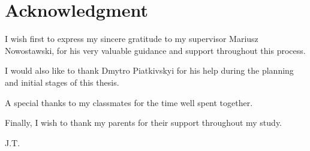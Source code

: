 \chapter*{Acknowledgment}

I wish first to express my sincere gratitude to my supervisor Mariusz Nowostawski, for his very valuable guidance and support throughout this process. 

I would also like to thank Dmytro Piatkivskyi for his help during the planning and initial stages of this thesis.

A special thanks to my classmates for the time well spent together.

Finally, I wish to thank my parents for their support throughout my study.


\begin{flushright}
J.T.\\[1pc]
\end{flushright}